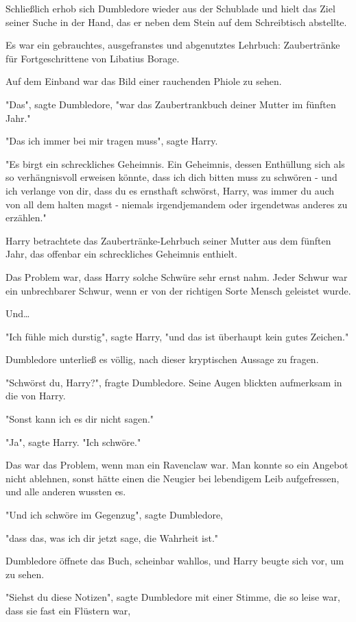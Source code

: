 {Schließlich erhob sich Dumbledore wieder aus der Schublade und hielt das Ziel seiner Suche in der Hand, das er neben dem Stein auf dem Schreibtisch abstellte.

Es war ein gebrauchtes, ausgefranstes und abgenutztes Lehrbuch: Zaubertränke für Fortgeschrittene von Libatius Borage.

Auf dem Einband war das Bild einer rauchenden Phiole zu sehen.

"Das", sagte Dumbledore, "war das Zaubertrankbuch deiner Mutter im fünften Jahr."

"Das ich immer bei mir tragen muss", sagte Harry.

"Es birgt ein schreckliches Geheimnis. Ein Geheimnis, dessen Enthüllung sich als so verhängnisvoll erweisen könnte, dass ich dich bitten muss zu schwören - und ich verlange von dir, dass du es ernsthaft schwörst, Harry, was immer du auch von all dem halten magst - niemals irgendjemandem oder irgendetwas anderes zu erzählen."

Harry betrachtete das Zaubertränke-Lehrbuch seiner Mutter aus dem fünften Jahr, das offenbar ein schreckliches Geheimnis enthielt.

Das Problem war, dass Harry solche Schwüre sehr ernst nahm. Jeder Schwur war ein unbrechbarer Schwur, wenn er von der richtigen Sorte Mensch geleistet wurde.

Und…

"Ich fühle mich durstig", sagte Harry, "und das ist überhaupt kein gutes Zeichen."

Dumbledore unterließ es völlig, nach dieser kryptischen Aussage zu fragen.

"Schwörst du, Harry?", fragte Dumbledore. Seine Augen blickten aufmerksam in die von Harry.

"Sonst kann ich es dir nicht sagen."

"Ja", sagte Harry. "Ich schwöre."

Das war das Problem, wenn man ein Ravenclaw war. Man konnte so ein Angebot nicht ablehnen, sonst hätte einen die Neugier bei lebendigem Leib aufgefressen, und alle anderen wussten es.

"Und ich schwöre im Gegenzug", sagte Dumbledore,

"dass das, was ich dir jetzt sage, die Wahrheit ist."

Dumbledore öffnete das Buch, scheinbar wahllos, und Harry beugte sich vor, um zu sehen.

"Siehst du diese Notizen", sagte Dumbledore mit einer Stimme, die so leise war, dass sie fast ein Flüstern war,

}
